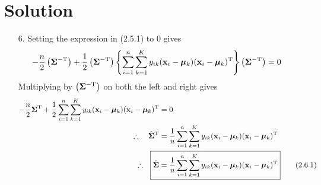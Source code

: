 \documentclass[submit]{../harvardml}
\newenvironment{solution}
  {\color{blue}\section*{Solution}}
{}
\begin{document}
\begin{solution}
\begin{enumerate}
    \item[6.] Setting the expression in (2.5.1) to 0 gives
    \begin{align*}
        -\frac{n}{2}\left(\mathbf{\Sigma}^{-\mathrm{T}}\right) + \frac{1}{2}\left(\mathbf{\Sigma}^{-\mathrm{T}}\right)\left\{ \sum_{i=1}^n\sum_{k=1}^K y_{ik} (\mathbf{x}_i - \boldsymbol{\mu}_k)(\mathbf{x}_i - \boldsymbol{\mu}_k)^\mathrm{T} \right\}\left(\mathbf{\Sigma}^{-\mathrm{T}}\right) &= 0
    \end{align*}
    Multiplying by $\left(\mathbf{\Sigma}^{-\mathrm{T}}\right)$ on both the left and right gives
    \begin{align*}
        -\frac{n}{2}\bSigma^{\mathrm{T}} + \frac{1}{2}\sum_{i=1}^n\sum_{k=1}^K y_{ik} (\boldx_i - \bmu_k)(\boldx_i - \bmu_k)^\mathrm{T} &= 0 \\
        \therefore \quad \hat{\bSigma}^{\mathrm{T}} &= \frac{1}{n}\sum_{i=1}^n\sum_{k=1}^K y_{ik} (\boldx_i - \bmu_k)(\boldx_i - \bmu_k)^\mathrm{T} \\
        \therefore \quad \Aboxed{ \hat{\bSigma} &= \frac{1}{n}\sum_{i=1}^n\sum_{k=1}^K y_{ik} (\boldx_i - \bmu_k)(\boldx_i - \bmu_k)^\mathrm{T} } \tag*{(2.6.1)}
    \end{align*}
\end{enumerate}

\end{solution}

\end{document}
